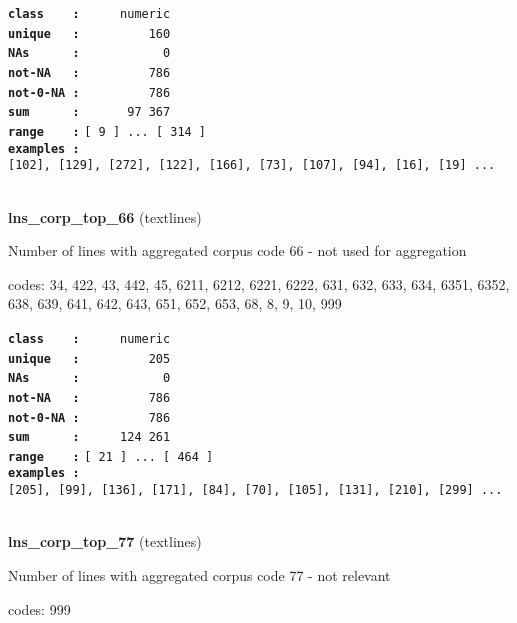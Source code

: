 \documentclass[]{article}
\begin{document}
\textbf{\texttt{class\ \ \ \ :}} \texttt{~~~~~numeric}\\
\textbf{\texttt{unique\ \ \ :}} \texttt{~~~~~~~~~160}\\
\textbf{\texttt{NAs\ \ \ \ \ \ :}} \texttt{~~~~~~~~~~~0}\\
\textbf{\texttt{not-NA\ \ \ :}} \texttt{~~~~~~~~~786}\\
\textbf{\texttt{not-0-NA\ :}} \texttt{~~~~~~~~~786}\\
\textbf{\texttt{sum\ \ \ \ \ \ :}} \texttt{~~~~~~97~367}\\
\textbf{\texttt{range\ \ \ \ :}}
\texttt{{[}\ 9\ {]}\ ...\ {[}\ 314\ {]}}\\
\textbf{\texttt{examples\ :}}
\texttt{{[}102{]},\ {[}129{]},\ {[}272{]},\ {[}122{]},\ {[}166{]},\ {[}73{]},\ {[}107{]},\ {[}94{]},\ {[}16{]},\ {[}19{]}\ ...}\\

~

\textbf{lns\_corp\_top\_66} (textlines)

Number of lines with aggregated corpus code 66 - not used for
aggregation

codes: 34, 422, 43, 442, 45, 6211, 6212, 6221, 6222, 631, 632, 633, 634,
6351, 6352, 638, 639, 641, 642, 643, 651, 652, 653, 68, 8, 9, 10, 999

\textbf{\texttt{class\ \ \ \ :}} \texttt{~~~~~numeric}\\
\textbf{\texttt{unique\ \ \ :}} \texttt{~~~~~~~~~205}\\
\textbf{\texttt{NAs\ \ \ \ \ \ :}} \texttt{~~~~~~~~~~~0}\\
\textbf{\texttt{not-NA\ \ \ :}} \texttt{~~~~~~~~~786}\\
\textbf{\texttt{not-0-NA\ :}} \texttt{~~~~~~~~~786}\\
\textbf{\texttt{sum\ \ \ \ \ \ :}} \texttt{~~~~~124~261}\\
\textbf{\texttt{range\ \ \ \ :}}
\texttt{{[}\ 21\ {]}\ ...\ {[}\ 464\ {]}}\\
\textbf{\texttt{examples\ :}}
\texttt{{[}205{]},\ {[}99{]},\ {[}136{]},\ {[}171{]},\ {[}84{]},\ {[}70{]},\ {[}105{]},\ {[}131{]},\ {[}210{]},\ {[}299{]}\ ...}\\

~

\textbf{lns\_corp\_top\_77} (textlines)

Number of lines with aggregated corpus code 77 - not relevant

codes: 999
\end{document}
